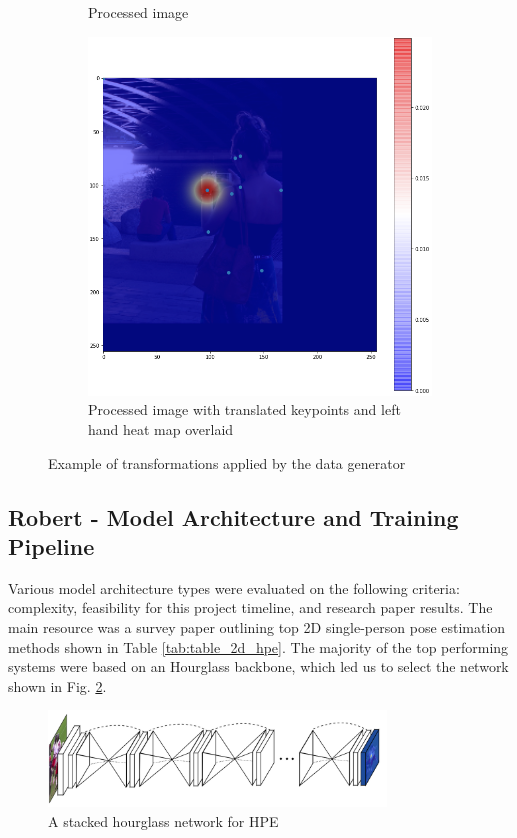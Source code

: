 \documentclass[11pt, letterpaper]{article}
\begin{document}
\begin{figure}[h]
\begin{subfigure}{0.4\textwidth}
        \caption{Processed image}
    \end{subfigure}
    \begin{subfigure}{0.4\textwidth}
        \centering
        \includegraphics[width=0.8\linewidth]{processed_image_w_anns.png}
        \caption{Processed image with translated keypoints and left hand heat map overlaid}
    \end{subfigure}
    \caption{Example of transformations applied by the data generator}
    \label{fig:data_gen_ex}
\end{figure}


\subsection{Robert - Model Architecture and Training Pipeline}
Various model architecture types were evaluated on the following criteria: complexity, feasibility for this project timeline, and research paper results. The main resource was a survey paper outlining top 2D single-person pose estimation methods shown in Table \ref{tab:table_2d_hpe}. The majority of the top performing systems were based on an Hourglass backbone, which led us to select the network shown in Fig. \ref{fig:stacked_hourglass}.

\begin{figure}[h!]
    \centering
    \includegraphics[width=0.8\textwidth]{stacked_hourglass}
    \caption{A stacked hourglass network for HPE \cite{newell2016stacked}}
    \label{fig:stacked_hourglass}
\end{figure}
\end{document}
